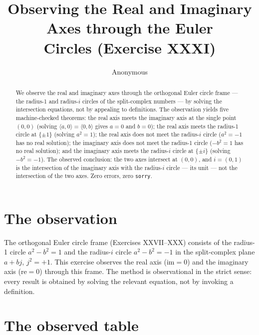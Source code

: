 \documentclass[sigplan,10pt,anonymous,review]{acmart}
\begin{document}
\title{Observing the Real and Imaginary Axes through the Euler\\
Circles (Exercise XXXI)}

\author{Anonymous}

\begin{abstract}
We observe the real and imaginary axes through the orthogonal Euler
circle frame --- the radius-1 and radius-$i$ circles of the split-complex
numbers --- by solving the intersection equations, not by appealing to
definitions. The observation yields five machine-checked theorems: the
real axis meets the imaginary axis at the single point $(0,0)$
(solving $\langle a, 0\rangle = \langle 0, b\rangle$ gives $a = 0$ and
$b = 0$); the real axis meets the radius-1 circle at $\{\pm 1\}$
(solving $a^2 = 1$); the real axis does not meet the radius-$i$ circle
($a^2 = -1$ has no real solution); the imaginary axis does not meet the
radius-1 circle ($-b^2 = 1$ has no real solution); and the imaginary
axis meets the radius-$i$ circle at $\{\pm i\}$ (solving $-b^2 = -1$).
The observed conclusion: the two axes intersect at $(0,0)$, and
$i = (0,1)$ is the intersection of the imaginary axis with the
radius-$i$ circle --- its unit --- not the intersection of the two axes.
Zero errors, zero \texttt{sorry}.
\end{abstract}


\maketitle

\section{The observation}

The orthogonal Euler circle frame (Exercises XXVII--XXX) consists of the
radius-1 circle $a^2 - b^2 = 1$ and the radius-$i$ circle
$a^2 - b^2 = -1$ in the split-complex plane $a + bj$, $j^2 = +1$. This
exercise observes the real axis ($\mathrm{im} = 0$) and the imaginary
axis ($\mathrm{re} = 0$) through this frame. The method is observational
in the strict sense: every result is obtained by solving the relevant
equation, not by invoking a definition.

\section{The observed table}
\end{document}
